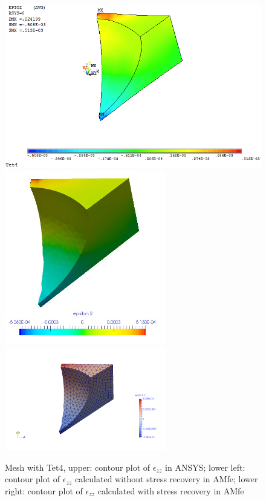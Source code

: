 \begin{figure}[htbp]
	\begin{center}
		\includegraphics[width=13cm,clip]{Tet4Ezz.png} 
		\includegraphics[width=7cm,clip]{Tet4EzzPD.png} 				
		\includegraphics[width=7cm,clip]{Tet4EzzP.png} 		
		\caption{Mesh with Tet4, upper: contour plot of $\epsilon_{zz}$ in ANSYS; lower left: contour plot of $\epsilon_{zz}$ calculated without stress recovery in AMfe; lower right: contour plot of $\epsilon_{zz}$ calculated with stress recovery in AMfe} \label{fig: Tet4_Ezz}
	\end{center}
\end{figure}
\clearpage 

